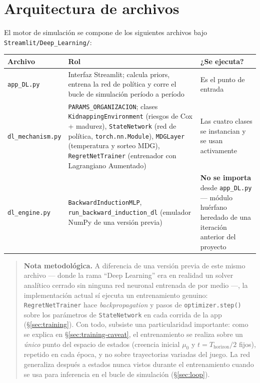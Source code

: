 \documentclass[ecta,nameyear,draft]{econsocart}
\newcommand{\pyfile}[1]{\texttt{#1}}
\newcommand{\pyvar}[1]{\texttt{#1}}
\begin{document}
\section{Arquitectura de archivos}

El motor de simulación se compone de los siguientes archivos bajo
\texttt{Streamlit/Deep\_Learning/}:

\begin{center}
\footnotesize
\begin{tabular}{@{}p{3.0cm}p{6.1cm}p{3.6cm}@{}}
\toprule
\textbf{Archivo} & \textbf{Rol} & \textbf{¿Se ejecuta?} \\
\midrule
\pyfile{app\_DL.py} & Interfaz Streamlit; calcula priors, entrena la red de política y corre el bucle de simulación período a período & Es el punto de entrada \\
\pyfile{dl\_mechanism.py} & \pyvar{PARAMS\_ORGANIZACION}; clases \pyvar{KidnappingEnvironment} (riesgos de Cox + madurez), \pyvar{StateNetwork} (red de política, \texttt{torch.nn.Module}), \pyvar{MDGLayer} (temperatura y sorteo MDG), \pyvar{RegretNetTrainer} (entrenador con Lagrangiano Aumentado) & Las cuatro clases se instancian y se usan activamente \\
\pyfile{dl\_engine.py} & \pyvar{BackwardInductionMLP}, \linebreak \pyvar{run\_backward\_induction\_dl} (emulador NumPy de una versión previa) & \textbf{No se importa} desde \pyfile{app\_DL.py} --- módulo huérfano heredado de una iteración anterior del proyecto \\
\bottomrule
\end{tabular}
\normalsize
\end{center}

\begin{quotation}
\noindent\textbf{Nota metodológica.} A diferencia de una versión previa de este mismo archivo
--- donde la rama ``Deep Learning'' era en realidad un solver analítico cerrado sin ninguna
red neuronal entrenada de por medio ---, la implementación actual sí ejecuta un entrenamiento
genuino: \pyvar{RegretNetTrainer} hace \emph{backpropagation} y pasos de \pyvar{optimizer.step()}
sobre los parámetros de \pyvar{StateNetwork} en cada corrida de la app (\S\ref{sec:training}).
Con todo, subsiste una particularidad importante: como se explica en
\S\ref{sec:training-caveat}, el entrenamiento se realiza sobre un \emph{único} punto del espacio
de estados (creencia inicial $\mu_0$ y $t=T_{\mathrm{horizon}}/2$ fijos), repetido en cada época,
y no sobre trayectorias variadas del juego. La red generaliza después a estados nunca vistos
durante el entrenamiento cuando se usa para inferencia en el bucle de simulación
(\S\ref{sec:loop}).
\end{quotation}
\end{document}
